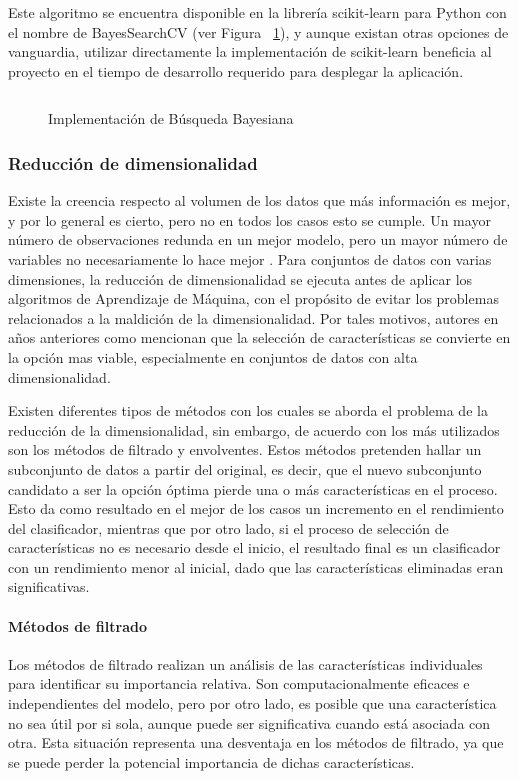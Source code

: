 Este algoritmo se encuentra disponible en la librería scikit-learn \parencite{sklearn_api} para Python con el nombre de BayesSearchCV (ver Figura ~\ref{fig:impbusbay}), y aunque existan otras opciones de vanguardia, utilizar directamente la implementación de scikit-learn beneficia al proyecto en el tiempo de desarrollo requerido para desplegar la aplicación.

\begin{figure}[H]
    \centering
    \caption{Implementación de Búsqueda Bayesiana}
    \inputminted{Python}{pycode/bayesiansearch.py}
    \label{fig:impbusbay}
\end{figure}


\subsubsection{Reducción de dimensionalidad}
Existe la creencia respecto al volumen de los datos que más información es mejor, y por lo general es cierto, pero no en todos los casos esto se cumple. Un mayor número de observaciones redunda en un mejor modelo, pero un mayor número de variables no necesariamente lo hace mejor \parencite{Guerrero2016}. Para conjuntos de datos con varias dimensiones, la reducción de dimensionalidad se ejecuta antes de aplicar los algoritmos de Aprendizaje de Máquina, con el propósito de evitar los problemas relacionados a la maldición de la dimensionalidad. Por tales motivos, autores en años anteriores como \textcite{Finley2005} mencionan que la selección de características se convierte en la opción mas viable, especialmente en conjuntos de datos con alta dimensionalidad.

Existen diferentes tipos de métodos con los cuales se aborda el problema de la reducción de la dimensionalidad, sin embargo, de acuerdo con \textcite{Finley2005,Sanchez-Marono2007} los más utilizados son los métodos de filtrado y envolventes. Estos métodos pretenden hallar un subconjunto de datos a partir del original, es decir, que el nuevo subconjunto candidato a ser la opción óptima pierde una o más características en el proceso. Esto da como resultado en el mejor de los casos un incremento en el rendimiento del clasificador, mientras que por otro lado, si el proceso de selección de características no es necesario desde el inicio, el resultado final es un clasificador con un rendimiento menor al inicial, dado que las características eliminadas eran significativas. 
 
\paragraph{Métodos de filtrado} Los métodos de filtrado realizan un análisis de las características individuales para identificar su importancia relativa. Son computacionalmente eficaces e independientes del modelo, pero por otro lado, es posible que una característica no sea útil por si sola, aunque puede ser significativa cuando está asociada con otra. Esta situación representa una desventaja en los métodos de filtrado, ya que se puede perder la potencial importancia de dichas características. 

